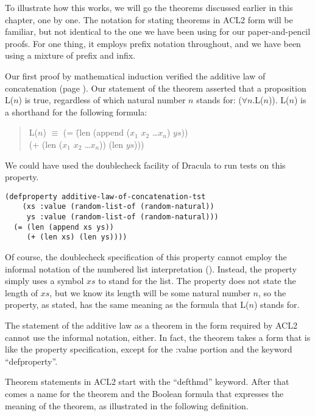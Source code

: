 To illustrate how this works, we will go the theorems 
discussed earlier in this chapter, one by one. 
The notation for stating theorems in ACL2 form will be familiar, 
but not identical to the one we have been using 
for our paper-and-pencil proofs. 
For one thing, it employs prefix notation throughout, 
and we have been using a mixture of prefix and infix.

Our first proof by mathematical induction verified 
the additive law of concatenation (page \pageref{additive-law-concatenation}). 
Our statement of the theorem asserted that a proposition L($n$) is true, 
regardless of which natural number $n$ stands for: ($\forall$$n$.L($n$)).
 L($n$) is a shorthand for the following formula:
\begin{quote}
\begin{tabbing}
L($n$) $\equiv$ (= \=(len (append ($x_1$ $x_2$ \dots $x_n$) $ys$))  \\
                   \>(+ (len ($x_1$ $x_2$ \dots $x_n$)) (len $ys$)))
\end{tabbing}
\end{quote}

We could have used the doublecheck facility of Dracula to run tests on this property.

\begin{lstlisting}
(defproperty additive-law-of-concatenation-tst
    (xs :value (random-list-of (random-natural))
     ys :value (random-list-of (random-natural)))
  (= (len (append xs ys))
     (+ (len xs) (len ys))))
\end{lstlisting}

Of course, the doublecheck specification of this property 
cannot employ the informal notation of the numbered list interpretation 
(\pageref{numbered-list-interpretation}). 
Instead, the property simply uses a symbol $xs$ to stand for the list. 
The property does not state the length of $xs$, but we know 
its length will be some natural number $n$, so the property, as stated, 
has the same meaning as the formula that L($n$) stands for.

The statement of the additive law as a theorem in the form 
required by ACL2 cannot use the informal notation, either. 
In fact, the theorem takes a form that is like the property specification, 
except for the :value portion and the keyword ``defproperty''.

Theorem statements in ACL2 start with the ``defthmd'' keyword. 
After that comes a name for the theorem and the Boolean formula 
that expresses the meaning of the theorem, as illustrated in the following definition.


